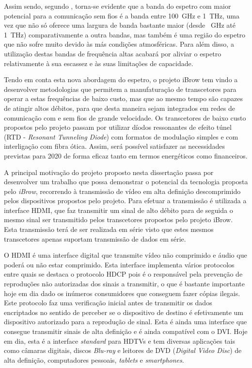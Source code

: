 Assim sendo, segundo \cite{R005}, torna-se evidente que a banda do espetro com maior potencial para a comunicação sem fios é a banda entre \SI{100}{\giga\hertz} e \SI{1}{\tera\hertz}, uma vez que não só oferece uma largura de banda bastante maior (desde \SI{}{\giga\hertz} até \SI{1}{\tera\hertz}) comparativamente a outra bandas, mas também é uma região do espetro que não sofre muito devido às más condições atmosféricas. Para além disso, a utilização destas bandas de frequência altas acabará por aliviar o espetro relativamente à sua escassez e às suas limitações de capacidade. 

Tendo em conta esta nova abordagem do espetro, o projeto iBrow tem vindo a desenvolver metodologias que permitem a manufaturação de transcetores para operar a estas frequências de baixo custo, mas que ao mesmo tempo são capazes de atingir altos débitos, para que desta maneira sejam integrados em redes de comunicação com e sem fios de grande velocidade. Os transcetores de baixo custo propostos pelo projeto passam por utilizar díodos ressonantes de efeito túnel (RTD - \textit{Resonant Tunneling Diode}) com formatos de modulação simples e com interligação com fibra ótica. Assim, será possível satisfazer as necessidades previstas para 2020 de forma eficaz tanto em termos energéticos como financeiros.


A principal motivação do projeto proposto nesta dissertação passa por desenvolver um trabalho que possa demonstrar o potencial da tecnologia proposta pelo \textit{iBrow}, recorrendo à transmissão de vídeo em alta definição descomprimido pelos dispositivos propostos pelo projeto. Para efetuar a transmissão é utilizada a interface HDMI, que faz transmitir um sinal de alto débito para de seguida o mesmo sinal ser transmitido pelos transcetores propostos pelo projeto iBrow. Esta transmissão terá de ser realizada em série visto que estes mesmos transcetores apenas suportam transmissão de dados em série.

O HDMI é uma interface digital que transmite vídeo não comprimido e áudio que poderá ou não estar comprimido. Esta interface implementa vários protocolos entre quais se destaca o protocolo HDCP pois é o responsável pela prevenção de reproduções não autorizadas dos sinais a transmitir, o que é bastante importante hoje em dia dado os inúmeros consumidores que conseguem fazer cópias ilegais. Este protocolo faz uma verificação inicial antes de transmitir os dados encriptados no sentido de perceber se o dispositivo de destino é efetivamente um dispositivo autorizado para a reprodução de sinal. Esta é ainda uma interface que consegue transmitir sinais de alta definição e é ainda compatível com o DVI. Hoje em dia, esta é a interface \textit{standard} para HDTVs e tem diversas aplicações tais como câmaras digitais, discos \textit{Blu-ray} e leitores de DVD (\textit{Digital Video Disc}) de alta definição, computadores pessoais, \textit{tablets} e \textit{smartphones}.

